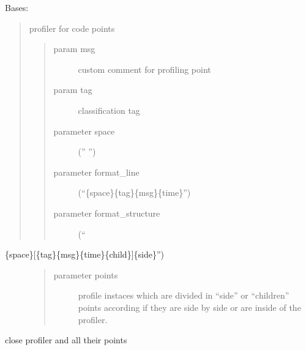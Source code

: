\documentclass[letterpaper,10pt,english]{sphinxmanual}
\begin{document}

\begin{fulllineitems}
\label{RRtoolbox.lib:RRtoolbox.lib.root.profiler}
Bases: 
\begin{quote}

profiler for code points
\begin{quote}\begin{description}
\item[{param msg}] \leavevmode
custom comment for profiling point

\item[{param tag}] \leavevmode
classification tag

\item[{parameter space}] \leavevmode
('' '')

\item[{parameter format\_line}] \leavevmode
(``\{space\}\{tag\}\{msg\}\{time\}'')

\item[{parameter format\_structure}] \leavevmode
(``

\end{description}\end{quote}
\end{quote}
\begin{description}
\item[{\{space\}{[}\{tag\}\{msg\}\{time\}\{child\}{]}\{side\}'')}] \leavevmode\begin{quote}\begin{description}
\item[{parameter points}] \leavevmode
profile instaces which are divided in ``side'' or ``children'' points
according if they are side by side or are inside of the profiler.

\end{description}\end{quote}

\end{description}

\begin{fulllineitems}
\label{RRtoolbox.lib:RRtoolbox.lib.root.profiler.close}
close profiler and all their points

\end{fulllineitems}


\end{fulllineitems}
\end{document}
